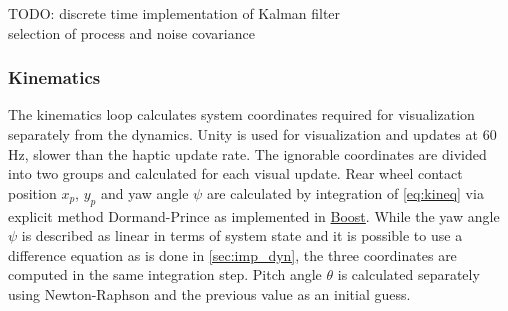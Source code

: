 \documentclass[11pt,a4paper,reqno]{amsart}
\newcommand{\x}{x_{p}}
\newcommand{\y}{y_{p}}
\newcommand{\pitch}{\theta}
\newcommand{\yaw}{\psi}
\begin{document}
TODO: discrete time implementation of Kalman filter\\
selection of process and noise covariance

\subsubsection{Kinematics}
The kinematics loop calculates system coordinates required for visualization separately from the dynamics.
Unity is used for visualization and updates at 60 Hz, slower than the haptic update rate.
The ignorable coordinates are divided into two groups and calculated for each visual update.
Rear wheel contact position $ \x $, $ \y $ and yaw angle $ \yaw $ are calculated by integration of \autoref{eq:kineq}
via explicit method Dormand-Prince as implemented in \href{http://www.boost.org/}{Boost}.
While the yaw angle $ \yaw $ is described as linear in terms of system state and it is possible to use a difference
equation as is done in \autoref{sec:imp_dyn}, the three coordinates are computed in the same integration step.
Pitch angle $ \pitch $ is calculated separately using Newton-Raphson and the previous value as an initial guess.
\end{document}

